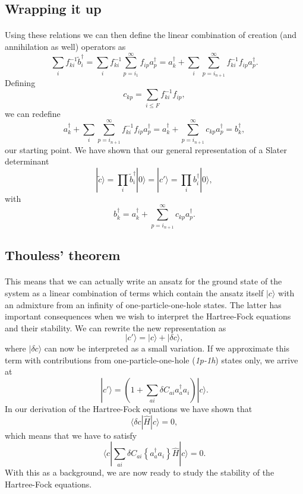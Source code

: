 \documentclass[%
twoside,                 %
final,                   %
10pt]{article}
\begin{document}
\subsection*{Wrapping it up}

\paragraph{}

Using these relations we can then define the linear combination of creation (and annihilation as well) 
operators as
\[
\sum_{i}f^{-1}_{ki}\tilde{b}^{\dagger}_{i}=\sum_{i}f^{-1}_{ki}\sum_{p=i_1}^{\infty}f_{ip}a_{p}^{\dagger}=a_{k}^{\dagger}+\sum_{i}\sum_{p=i_{n+1}}^{\infty}f^{-1}_{ki}f_{ip}a_{p}^{\dagger}.
\]
Defining 
\[
c_{kp}=\sum_{i \le F}f^{-1}_{ki}f_{ip},
\]
we can redefine 
\[
a_{k}^{\dagger}+\sum_{i}\sum_{p=i_{n+1}}^{\infty}f^{-1}_{ki}f_{ip}a_{p}^{\dagger}=a_{k}^{\dagger}+\sum_{p=i_{n+1}}^{\infty}c_{kp}a_{p}^{\dagger}=b_k^{\dagger},
\]
our starting point. We have shown that our general representation of a Slater determinant 
\[
|\tilde{c}\rangle=\prod_{i}\tilde{b}^{\dagger}_{i}|0\rangle=|c'\rangle=\prod_{i}b^{\dagger}_{i}|0\rangle,
\]
with 
\[
b_k^{\dagger}=a_{k}^{\dagger}+\sum_{p=i_{n+1}}^{\infty}c_{kp}a_{p}^{\dagger}.
\]




\subsection*{Thouless' theorem}

\paragraph{}

This means that we can actually write an ansatz for the ground state of the system as a linear combination of
terms which contain the ansatz itself $|c\rangle$ with  an admixture from an infinity of one-particle-one-hole states. The latter has important consequences when we wish to interpret the Hartree-Fock equations and their stability. We can rewrite the new representation as 
\[
|c'\rangle = |c\rangle+|\delta c\rangle,
\]
where $|\delta c\rangle$ can now be interpreted as a small variation. If we approximate this term with 
contributions from one-particle-one-hole (\emph{1p-1h}) states only, we arrive at 
\[
|c'\rangle = \left(1+\sum_{ai}\delta C_{ai}a_{a}^{\dagger}a_i\right)|c\rangle.
\]
In our derivation of the Hartree-Fock equations we have shown that 
\[
\langle \delta c| \hat{H} | c\rangle =0,
\]
which means that we have to satisfy
\[
\langle c|\sum_{ai}\delta C_{ai}\left\{a_{a}^{\dagger}a_i\right\} \hat{H} | c\rangle =0.
\]
With this as a background, we are now ready to study the stability of the Hartree-Fock equations.
\end{document}

